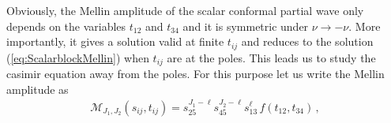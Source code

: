 Obviously, the Mellin amplitude of the scalar conformal partial wave only depends on the variables $t_{12}$ and $t_{34}$ and it is symmetric under $\nu\rightarrow -\nu$. More importantly,  it gives a solution valid at finite $t_{ij}$ and reduces to the solution (\ref{eq:ScalarblockMellin}) when $t_{ij}$ are at the poles. This leads us to study the casimir equation away from the poles.
For this purpose let us write the Mellin amplitude as
\begin{align}
  \label{eq:ReggeizePartialWaveMellinSpace}
  \mathcal{M}_{J_1,J_2}(s_{ij},t_{ij}) = s_{25}^{J_1-\ell}s_{45}^{J_2-\ell}s_{13}^{\ell}\, f(t_{12},t_{34})\,,
\end{align}
